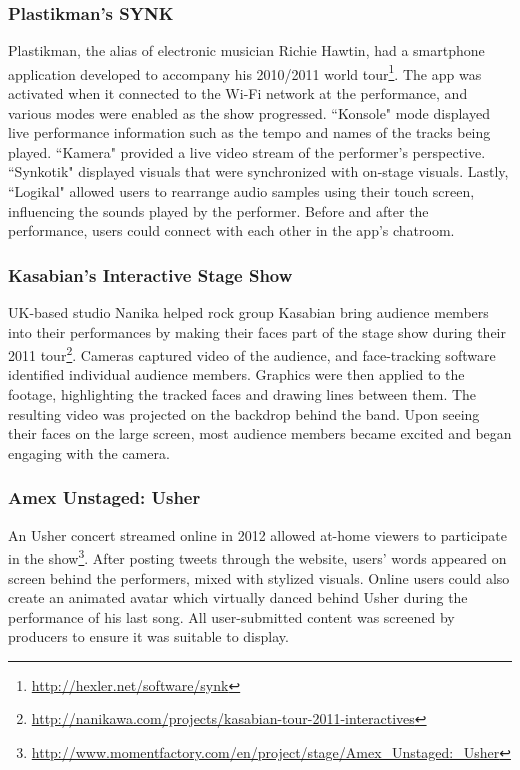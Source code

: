 \subsubsection{Plastikman's SYNK}

Plastikman, the alias of electronic musician Richie Hawtin, had a smartphone application developed to accompany his 2010/2011 world tour\footnote{\url{http://hexler.net/software/synk}}. The app was activated when it connected to the Wi-Fi network at the performance, and various modes were enabled as the show progressed. ``Konsole" mode displayed live performance information such as the tempo and names of the tracks being played. ``Kamera" provided a live video stream of the performer's perspective. ``Synkotik" displayed visuals that were synchronized with on-stage visuals. Lastly, ``Logikal" allowed users to rearrange audio samples using their touch screen, influencing the sounds played by the performer. Before and after the performance, users could connect with each other in the app's chatroom.

\subsubsection{Kasabian's Interactive Stage Show}

UK-based studio Nanika helped rock group Kasabian bring audience members into their performances by making their faces part of the stage show during their 2011 tour\footnote{\url{http://nanikawa.com/projects/kasabian-tour-2011-interactives}}. Cameras captured video of the audience, and face-tracking software identified individual audience members. Graphics were then applied to the footage, highlighting the tracked faces and drawing lines between them. The resulting video was projected on the backdrop behind the band. Upon seeing their faces on the large screen, most audience members became excited and began engaging with the camera.

\subsubsection{Amex Unstaged: Usher}
An Usher concert streamed online in 2012 allowed at-home viewers to participate in the show\footnote{\url{http://www.momentfactory.com/en/project/stage/Amex_Unstaged:_Usher}}. After posting tweets through the website, users' words appeared on screen behind the performers, mixed with stylized visuals. Online users could also create an animated avatar which virtually danced behind Usher during the performance of his last song. All user-submitted content was screened by producers to ensure it was suitable to display. 

